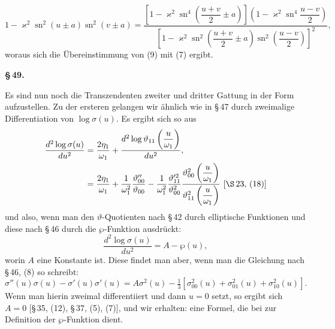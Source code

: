 
\[
1 - \varkappa^2\operatorname{sn}^2(u\pm a)\operatorname{sn}^2(v\pm a) = \dfrac{\left[1-\varkappa^2\operatorname{sn}^4\left(\dfrac{u+v}{2}\pm a\right)\right]\left(1-\varkappa^2\operatorname{sn}^4\dfrac{u-v}{2}\right)}{\left[1-\varkappa^2\operatorname{sn}^2\left(\dfrac{u+v}{2}\pm a\right)\operatorname{sn}^2\!\left(\dfrac{u-v}{2}\right)\right]^2},
\]
woraus sich die Übereinstimmung von (9) mit (7) ergibt.

\begin{center}
\textbf{\S\,49. \\
}
\end{center}

Es sind nun noch die Transzendenten zweiter und dritter
Gattung in der  Form aufzustellen. Zu der
ersteren gelangen wir ähnlich wie in \S\,47 durch zweimalige
Differentiation von $\log \sigma(u)$. Es ergibt sich so aus
\[
\begin{aligned}
\frac{d^2 \log \sigma(u)}{du^2} &= \frac{2\eta_1}{\omega_1} + \frac{d^2\log \vartheta_{11}\left(\dfrac{u}{\omega_1}\right)}{du^2},\\
&= \frac{2\eta_1}{\omega_1} + \frac{1}{\omega_1^2}\frac{\vartheta_{00}''}{\vartheta_{00}} - \frac{1}{\omega_1^2}\frac{\vartheta_{11}'^2}{\vartheta_{00}^2}\frac{\vartheta_{00}^2\left(\dfrac{u}{\omega_1}\right)}{\vartheta_{11}^2\left(\dfrac{u}{\omega_1}\right)} \ [\S\,23,\,(18)]
\end{aligned}
\]
und also, wenn man den $\vartheta$-Quotienten nach \S\,42 durch elliptische
Funktionen und diese nach \S\,46 durch die $\wp$-Funktion ausdrückt:
\[
\frac{d^2\log\sigma(u)}{du^2} = A - \wp(u),
\]
worin $A$ eine Konstante ist. Diese findet man aber, wenn man
die Gleichung nach \S\,46, (8) so schreibt:
\[
\sigma''(u)\sigma(u) - \sigma'(u)\sigma'(u) = A\sigma^2(u) - \tfrac{1}{3}\left[\sigma_{00}^2(u) + \sigma_{01}^2(u) + \sigma_{10}^2(u)\right].
\]
Wenn man hierin zweimal differentiiert und dann $u=0$
setzt, so ergibt sich $A=0$ [\S\,35, (12), \S\,37, (5), (7)], und wir
erhalten:
eine Formel, die bei  zur Definition der $\wp$-Funktion
dient.
